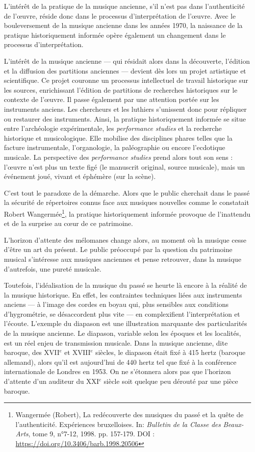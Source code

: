 \smallskip\indent L’intérêt de la pratique de la musique ancienne, s’il n’est pas dans l’authenticité de l'œuvre, réside donc dans le processus d’interprétation de l'œuvre. Avec le bouleversement de la musique ancienne dans les années 1970, la naissance de la pratique historiquement informée opère également un changement dans le processus d’interprétation.

\smallskip\indent L’intérêt de la musique ancienne --- qui résidait alors dans la découverte, l'édition et la diffusion des partitions anciennes --- devient dès lors un projet artistique et scientifique. Ce projet couronne un processus intellectuel de travail historique sur les sources, enrichissant l’édition de partitions de recherches historiques sur le contexte de l'œuvre. Il passe également par une attention portée sur les instruments anciens. Les chercheurs et les luthiers s’unissent donc pour répliquer ou restaurer des instruments. Ainsi, la pratique historiquement informée se situe entre l’archéologie expérimentale, les \textit{performance studies} et la recherche historique et musicologique. Elle mobilise des disciplines phares telles que la facture instrumentale, l’organologie, la paléographie ou encore l’ecdotique musicale. La perspective des \textit{performance studies} prend alors tout son sens : l'œuvre n'est plus un texte figé (le manuscrit original, source musicale), mais un événement joué, vivant et éphémère (sur la scène).

\smallskip\indent C'est tout le paradoxe de la démarche. Alors que le public cherchait dans le passé la sécurité de répertoires connus face aux musiques nouvelles comme le constatait Robert Wangermée\footnote{Wangermée (Robert), La redécouverte des musiques du passé et la quête de l'authenticité. Expériences bruxelloises. In: \textit{Bulletin de la Classe des Beaux-Arts}, tome 9, n°7-12, 1998. pp. 157-179. DOI : \url{https://doi.org/10.3406/barb.1998.20506}}, la pratique historiquement informée provoque de l'inattendu et de la surprise au cœur de ce patrimoine.

\smallskip\indent L’horizon d’attente des mélomanes change alors, au moment où la musique cesse d’être un art du présent. Le public préoccupé par la question du patrimoine musical s’intéresse aux musiques anciennes et pense retrouver, dans la musique d’autrefois, une pureté musicale.

\bigskip Toutefois, l’idéalisation de la musique du passé se heurte là encore à la réalité de la musique historique. En effet, les contraintes techniques liées aux instruments anciens --- à l’image des cordes en boyau qui, plus sensibles aux conditions d’hygrométrie, se désaccordent plus vite --- en complexifient l’interprétation et l’écoute. L’exemple du diapason est une illustration marquante des particularités de la musique ancienne. Le diapason, variable selon les époques et les localités, est un réel enjeu de transmission musicale. Dans la musique ancienne, dite baroque, des XVII$^{e}$ et XVIII$^{e}$ siècles, le diapason était fixé à 415 hertz (baroque allemand), alors qu’il est aujourd’hui de 440 hertz tel que fixé à la conférence internationale de Londres en 1953. On ne s'étonnera alors pas que l’horizon d’attente d’un auditeur du XXI$^{e}$ siècle soit quelque peu dérouté par une pièce baroque.

